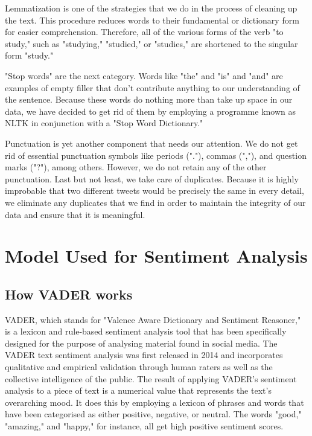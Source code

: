 \documentclass[12pt, a4paper,twoside]{report}
\theoremstyle{plain} %
\theoremstyle{definition} %
\theoremstyle{remark} %
\numberwithin{equation}{chapter}
\begin{document}
Lemmatization is one of the strategies that we do in the process of cleaning up the text. This procedure reduces words to their fundamental or dictionary form for easier comprehension. Therefore, all of the various forms of the verb "to study," such as "studying," "studied," or "studies," are shortened to the singular form "study."

"Stop words" are the next category. Words like "the" and "is" and "and" are examples of empty filler that don't contribute anything to our understanding of the sentence. Because these words do nothing more than take up space in our data, we have decided to get rid of them by employing a programme known as NLTK in conjunction with a "Stop Word Dictionary."

Punctuation is yet another component that needs our attention. We do not get rid of essential punctuation symbols like periods ("."), commas (","), and question marks ("?"), among others. However, we do not retain any of the other punctuation. Last but not least, we take care of duplicates. Because it is highly improbable that two different tweets would be precisely the same in every detail, we eliminate any duplicates that we find in order to maintain the integrity of our data and ensure that it is meaningful.

    \section{Model Used for Sentiment Analysis}


    
    \subsection{How VADER works}

VADER, which stands for "Valence Aware Dictionary and Sentiment Reasoner," is a lexicon and rule-based sentiment analysis tool that has been specifically designed for the purpose of analysing material found in social media. The VADER text sentiment analysis was first released in 2014 and incorporates qualitative and empirical validation through human raters as well as the collective intelligence of the public. The result of applying VADER's sentiment analysis to a piece of text is a numerical value that represents the text's overarching mood.  It does this by employing a lexicon of phrases and words that have been categorised as either positive, negative, or neutral. The words "good," "amazing," and "happy," for instance, all get high positive sentiment scores. 
\end{document}
